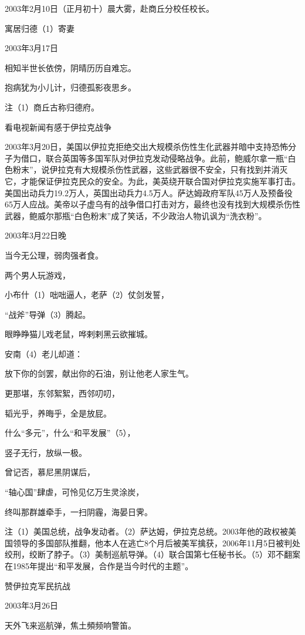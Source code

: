 \documentclass[../../dazhuan.tex]{subfiles}
\begin{document}
2003年2月10日（正月初十）晨大雾，赴商丘分校任校长。

寓居归德（1）寄妻

2003年3月17日

相知半世长依傍，阴晴历历自难忘。

抱病犹为小儿计，归德孤影夜思乡。

注（1）商丘古称归德府。



看电视新闻有感于伊拉克战争

2003年3月20日，美国以伊拉克拒绝交出大规模杀伤性生化武器并暗中支持恐怖分子为借口，联合英国等多国军队对伊拉克发动侵略战争。此前，鲍威尔拿一瓶“白色粉末”，说伊拉克有大规模杀伤性武器，这些武器很不安全，只有找到并消灭它，才能保证伊拉克民众的安全。为此，美英绕开联合国对伊拉克实施军事打击。美国出动兵力19.2万人，英国出动兵力4.5万人。萨达姆政府军队45万人及预备役65万人应战。美帝以子虚乌有的战争借口打击对方，最终也没有找到大规模杀伤性武器，鲍威尔那瓶“白色粉末”成了笑话，不少政治人物讥讽为“洗衣粉”。

2003年3月22日晚

当今无公理，弱肉强者食。

两个男人玩游戏，

小布什（1）咄咄逼人，老萨（2）仗剑发誓，

“战斧”导弹（3）腾起。

眼睁睁猫儿戏老鼠，哗剌剌黑云欲摧城。

安南（4）老儿却道：

放下你的剑罢，献出你的石油，别让他老人家生气。

更那堪，东邻絮絮，西邻叨叨，

韬光乎，养晦乎，全是放屁。

什么“多元”，什么“和平发展”（5），

竖子无行，放纵一极。

曾记否，慕尼黑阴谋后，

“轴心国”肆虐，可怜见亿万生灵涂炭，

终叫那群雄牵手，一扫阴霾，海晏日霁。

注（1）美国总统，战争发动者。（2）萨达姆，伊拉克总统。2003年他的政权被美国领导的多国部队推翻，他本人在逃亡8个月后被美军擒获，2006年11月5日被判处绞刑，绞断了脖子。（3）美制巡航导弹。（4）联合国第七任秘书长。（5）邓不翻案在1985年提出“和平发展，合作是当今时代的主题”。



赞伊拉克军民抗战

2003年3月26日

天外飞来巡航弹，焦土頻频响警笛。
\end{document}
